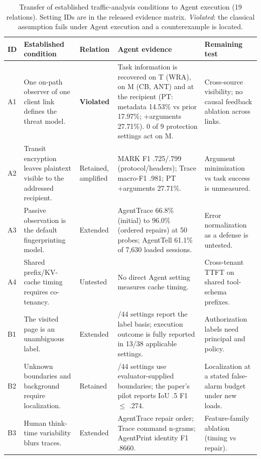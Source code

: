 \begin{table}[t]\centering\footnotesize
\caption{Transfer of established traffic-analysis conditions to Agent execution (19 relations). Setting IDs are in the released evidence matrix. \emph{Violated}: the classical assumption fails under Agent execution and a counterexample is located.}\label{tab:transfer-v2}
\begin{tabularx}{\textwidth}{@{}l>{\raggedright\arraybackslash}X>{\raggedright\arraybackslash}p{2.1cm}>{\raggedright\arraybackslash}X>{\raggedright\arraybackslash}X@{}}\toprule ID & Established condition & Relation & Agent evidence & Remaining test\\\midrule
A1 & One on-path observer of one client link defines the threat model. & \textbf{Violated} & Task information is recovered on T (WRA), on M (CB, ANT) and at the recipient (PT: metadata 14.53\% vs prior 17.97\%; +arguments 27.71\%). 0 of 9 protection settings act on M. & Cross-source visibility; no causal feedback ablation across links.\\
A2 & Transit encryption leaves plaintext visible to the addressed recipient. & Retained, amplified & MARK F1 .725/.799 (protocol/headers); Trace macro-F1 .981; PT +arguments 27.71\%. & Argument minimization vs task success is unmeasured.\\
A3 & Passive observation is the default fingerprinting model. & Extended & AgentTrace 66.8\% (initial) to 96.0\% (ordered repairs) at 50 probes; AgentTell 61.1\% of 7,630 loaded sessions. & Error normalization as a defense is untested.\\
A4 & Shared prefix/KV-cache timing requires co-tenancy. & Untested & No direct Agent setting measures cache timing. & Cross-tenant TTFT on shared tool-schema prefixes.\\
B1 & The visited page is an unambiguous label. & Extended & 42/44 settings report the label basis; execution outcome is fully reported in 13/38 applicable settings. & Authorization labels need principal and policy.\\
B2 & Unknown boundaries and background require localization. & Retained & 43/44 settings use evaluator-supplied boundaries; the paper's pilot reports IoU .5 F1 $\le$ .274. & Localization at a stated false-alarm budget under new loads.\\
B3 & Human think-time variability blurs traces. & Extended & AgentTrace repair order; Trace command n-grams; AgentPrint identity F1 .8660. & Feature-family ablation (timing vs repair).\\

\end{tabularx}
\end{table}
